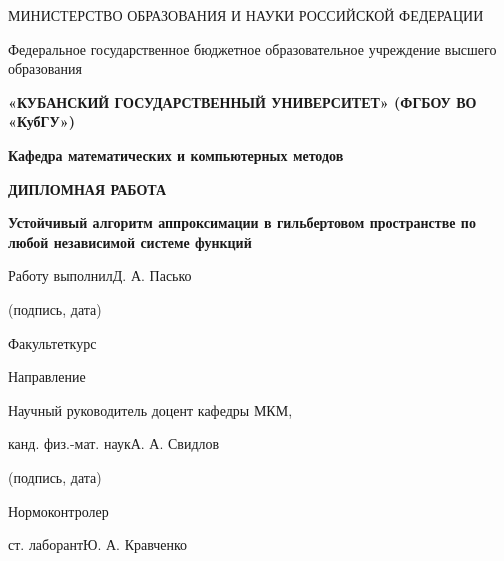 ﻿\documentclass[a4paper, 12pt]{article}
\begin{document}
\noindent 

\noindent 

\noindent 

\noindent МИНИСТЕРСТВО ОБРАЗОВАНИЯ И НАУКИ РОССИЙСКОЙ ФЕДЕРАЦИИ

\noindent Федеральное государственное бюджетное образовательное учреждение высшего образования

\noindent \textbf{«КУБАНСКИЙ ГОСУДАРСТВЕННЫЙ УНИВЕРСИТЕТ»         (ФГБОУ ВО «КубГУ»)}

\noindent 

\noindent \textbf{Кафедра математических и компьютерных методов}

\noindent 

\noindent 

\noindent 

\noindent 

\noindent 

\noindent \textbf{ДИПЛОМНАЯ РАБОТА}

\noindent \textbf{}

\noindent \textbf{Устойчивый алгоритм аппроксимации в гильбертовом пространстве по любой независимой системе функций}

\noindent

\noindent
  
\noindent 

\noindent 

\noindent Работу выполнил\underbar{                                                                  }Д. А. Пасько

\noindent (подпись, дата)

\noindent 

\noindent Факультеткурс 

\noindent Направление                                 

\noindent 

\noindent Научный руководитель                                                                                                              доцент кафедры МКМ,

\noindent канд. физ.-мат. наук\underbar{                                                             }А. А. Свидлов 

\noindent (подпись, дата)

\noindent Нормоконтролер

\noindent ст. лаборант\underbar{                                                                           }Ю. А. Кравченко\underbar{}
\end{document}

